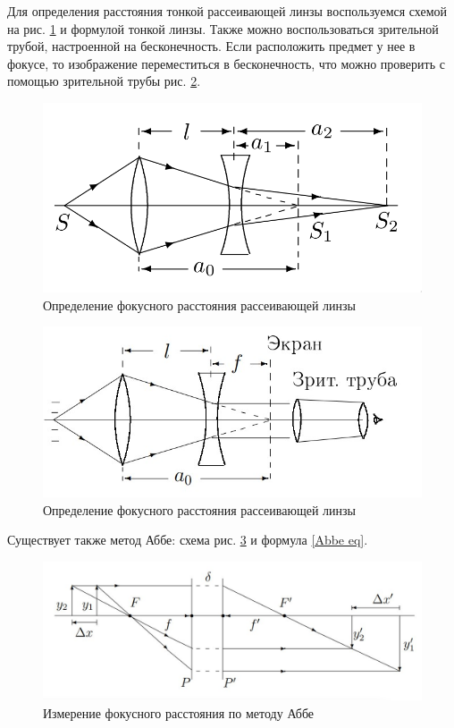 \documentclass[
a4paper, %
12pt, %
]{article}
\begin{document}
	Для определения расстояния тонкой рассеивающей линзы воспользуемся схемой на рис. \ref{focus_scattering} и формулой тонкой линзы. Также можно воспользоваться зрительной трубой, настроенной на бесконечность. Если расположить предмет у нее в фокусе, то изображение переместиться в бесконечность, что можно проверить с помощью зрительной трубы рис. \ref{Tube_scattering}.
	
	\begin{figure}[h!]
		\centering
		\includegraphics[scale=0.4]{measurement_scattering_lens.png}
		\caption{Определение фокусного расстояния рассеивающей линзы}
		\label{focus_scattering}
	\end{figure}
	
	\begin{figure}[h!]
		\centering
		\includegraphics[scale=0.8]{tube_scattering.jpg}
		\caption{Определение фокусного расстояния рассеивающей линзы}
		\label{Tube_scattering}
	\end{figure}
	
	Существует также метод Аббе: схема рис. \ref{Abbe} и формула \eqref{Abbe eq}.
	
		\begin{figure}[h!]
		\centering
		\includegraphics[scale=0.6]{Abbe.jpg}
		\caption{Измерение фокусного расстояния по методу Аббе}
		\label{Abbe}
	\end{figure}
	
\end{document}
